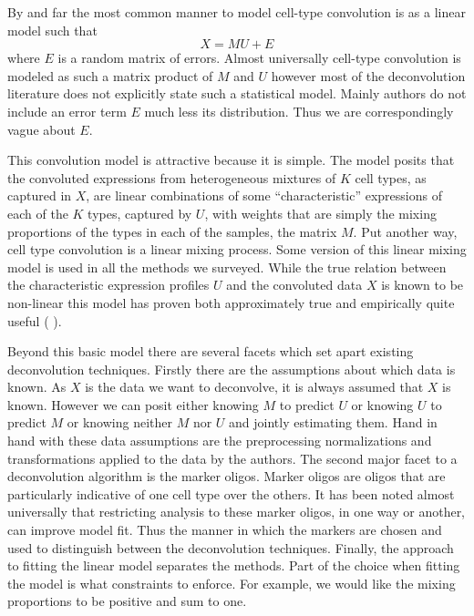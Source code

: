 \documentclass[reqno,12pt,oneside]{report}\usepackage[]{graphicx}\usepackage[]{color}
\renewcommand{\citet}[1]{(\citeauthor{#1} \citeyear{#1})}
\theoremstyle{plain}
\theoremstyle{definition}
\theoremstyle{remark}
\numberwithin{theorem}{chapter}     %
\begin{document}
By and far the most common manner to model cell-type convolution is as a linear model such that
\begin{equation}
  \label{mainmodeqn}
X = MU + E
\end{equation}
where $E$ is a random matrix of errors. Almost universally cell-type convolution is modeled as such a matrix product of $M$ and $U$ however most of the deconvolution literature does not explicitly state such a statistical model. Mainly authors do not include an error term $E$ much less its distribution. Thus we are correspondingly vague about $E$. 

This convolution model is attractive because it is simple. The model posits that the convoluted expressions from heterogeneous mixtures of $K$ cell types, as captured in $X$, are linear combinations of some ``characteristic'' expressions of each of the $K$ types, captured by $U$, with weights that are simply the mixing proportions of the types in each of the samples, the matrix $M$. Put another way, cell type convolution is a linear mixing process. Some version of this linear mixing model is used in all the methods we surveyed. While the true relation between the characteristic expression profiles $U$ and the convoluted data $X$ is known to be non-linear this model has proven both approximately true and empirically quite useful \citet{Shen-Orr2010}.

Beyond this basic model there are several facets which set apart existing deconvolution techniques. Firstly there are the assumptions about which data is known. As $X$ is the data we want to deconvolve, it is always assumed that $X$ is known. However we can posit either knowing $M$ to predict $U$ or knowing $U$ to predict $M$ or knowing neither $M$ nor $U$ and jointly estimating them. Hand in hand with these data assumptions are the preprocessing normalizations and transformations applied to the data by the authors. The second major facet to a deconvolution algorithm is the marker oligos. Marker oligos are oligos that are particularly indicative of one cell type over the others. It has been noted almost universally that restricting analysis to these marker oligos, in one way or another, can improve model fit. Thus the manner in which the markers are chosen and used to distinguish between the deconvolution techniques. Finally, the approach to fitting the linear model separates the methods. Part of the choice when fitting the model is what constraints to enforce. For example, we would like the mixing proportions to be positive and sum to one.
\end{document}
